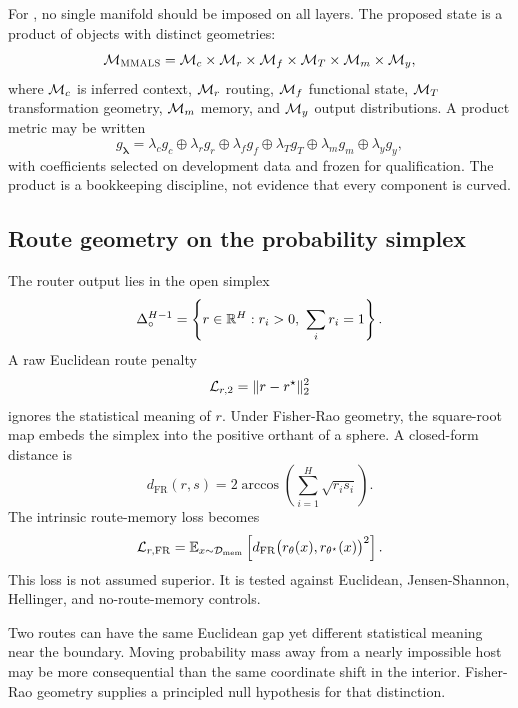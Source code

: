 For \MMALS{}, no single manifold should be imposed on all layers. The proposed state is a product of objects with distinct geometries:
\begin{equation}
  \mathcal{M}_{\textsc{MMALS}}
  = \mathcal{M}_c \times \mathcal{M}_r \times \mathcal{M}_f \times \mathcal{M}_T \times \mathcal{M}_m \times \mathcal{M}_y,
  \label{eq:product-manifold}
\end{equation}
where $\mathcal{M}_c$ is inferred context, $\mathcal{M}_r$ routing, $\mathcal{M}_f$ functional state, $\mathcal{M}_T$ transformation geometry, $\mathcal{M}_m$ memory, and $\mathcal{M}_y$ output distributions. A product metric may be written
\begin{equation}
  g_{\bm{\lambda}}
  = \lambda_c g_c \oplus \lambda_r g_r \oplus \lambda_f g_f
    \oplus \lambda_T g_T \oplus \lambda_m g_m \oplus \lambda_y g_y,
  \label{eq:product-metric}
\end{equation}
with coefficients selected on development data and frozen for qualification. The product is a bookkeeping discipline, not evidence that every component is curved.

\subsection{Route geometry on the probability simplex}
The router output lies in the open simplex
\begin{equation}
  \Delta^{H-1}_{\circ}
  = \left\{r\in\mathbb{R}^H: r_i>0,\ \sum_i r_i=1\right\}.
\end{equation}
A raw Euclidean route penalty
\begin{equation}
  \mathcal{L}_{r,2}=\|r-r^\star\|_2^2
\end{equation}
ignores the statistical meaning of $r$. Under Fisher-Rao geometry, the square-root map embeds the simplex into the positive orthant of a sphere. A closed-form distance is
\begin{equation}
  d_{\mathrm{FR}}(r,s)
  = 2\arccos\!\left(\sum_{i=1}^{H}\sqrt{r_i s_i}\right).
  \label{eq:fisher-rao}
\end{equation}
The intrinsic route-memory loss becomes
\begin{equation}
  \mathcal{L}_{r,\mathrm{FR}}
  = \mathbb{E}_{x\sim\mathcal{D}_{\mathrm{mem}}}
    \left[d_{\mathrm{FR}}\big(r_{\theta}(x),r_{\theta^\star}(x)\big)^2\right].
  \label{eq:route-loss}
\end{equation}
This loss is not assumed superior. It is tested against Euclidean, Jensen-Shannon, Hellinger, and no-route-memory controls.

\begin{engineeringbox}
Two routes can have the same Euclidean gap yet different statistical meaning near the boundary. Moving probability mass away from a nearly impossible host may be more consequential than the same coordinate shift in the interior. Fisher-Rao geometry supplies a principled null hypothesis for that distinction.
\end{engineeringbox}

